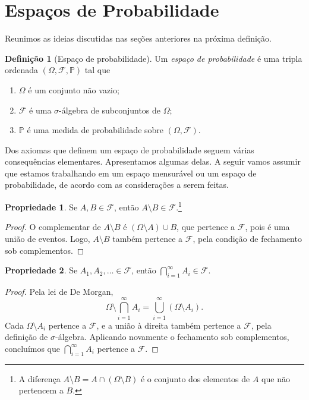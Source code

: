 \documentclass[12pt,portuguese]{article}
\theoremstyle{definition}
\newtheorem{definition}[definition]{Definição}
\newtheorem*{property}{Propriedade}
\begin{document}
\section{Espaços de Probabilidade}

Reunimos as ideias discutidas nas seções anteriores na próxima definição.

\begin{definition}[Espaço de probabilidade]\label{def:probability-space}
Um \emph{espaço de probabilidade} é uma tripla ordenada
\((\Omega, \mathcal{F}, \mathbb{P})\) tal que
\begin{enumerate}[label=(\alph*), ref=\alph*]
\item \(\Omega\) é um conjunto não vazio;
\item \(\mathcal{F}\) é uma \(\sigma\)-álgebra de subconjuntos de
\(\Omega\);
\item \(\mathbb{P}\) é uma medida de probabilidade sobre
\((\Omega, \mathcal{F})\).
\end{enumerate}
\end{definition}

Dos axiomas que definem um espaço de probabilidade seguem várias
consequências elementares. Apresentamos algumas delas. 
A seguir vamos assumir que estamos trabalhando em um espaço 
mensurável ou um espaço de probabilidade, de acordo com as considerações a serem feitas.

\begin{property}
Se \(A, B \in \mathcal{F}\), então \(A \setminus B \in \mathcal{F}\).\footnote{
A diferença \(A \setminus B = A \cap (\Omega \setminus B)\) é o conjunto
dos elementos de \(A\) que não pertencem a \(B\).}
\end{property}

\begin{proof}
O complementar de \(A \setminus B\) é
\((\Omega \setminus A) \cup B\), que pertence a \(\mathcal{F}\), pois é
uma união de eventos. Logo, \(A \setminus B\) também pertence a
\(\mathcal{F}\), pela condição de fechamento sob complementos.
\end{proof}

\begin{property}
Se \(A_1, A_2, \ldots \in \mathcal{F}\), então
\(\bigcap_{i=1}^{\infty} A_i \in \mathcal{F}\).
\end{property}

\begin{proof}
Pela lei de De Morgan,
\[
\Omega \setminus \bigcap_{i=1}^{\infty} A_i
= \bigcup_{i=1}^{\infty} (\Omega \setminus A_i).
\]
Cada \(\Omega \setminus A_i\) pertence a \(\mathcal{F}\), e a união à
direita também pertence a \(\mathcal{F}\), pela definição de
\(\sigma\)-álgebra. Aplicando novamente o fechamento sob complementos,
concluímos que \(\bigcap_{i=1}^{\infty} A_i\) pertence a \(\mathcal{F}\).
\end{proof}
\end{document}
